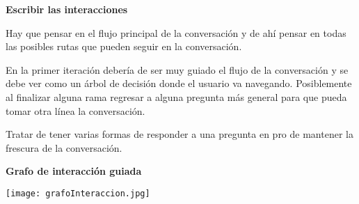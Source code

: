 \textbf{Escribir las interacciones}

Hay que pensar en el flujo principal de la conversación y de ahí pensar en todas las posibles rutas que pueden seguir en la conversación.

En la primer iteración debería de ser muy guiado el flujo de la conversación y se debe ver como un árbol de decisión donde el usuario va navegando. Posiblemente al finalizar alguna rama regresar a alguna pregunta más general para que pueda tomar otra línea la conversación.

Tratar de tener varias formas de responder a una pregunta en pro de mantener la frescura de la conversación.

\textbf{Grafo de interacción guiada}

\texttt{[image: grafoInteraccion.jpg]}
